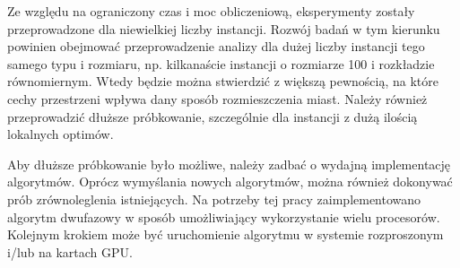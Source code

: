 Ze względu na ograniczony czas i moc obliczeniową, eksperymenty zostały przeprowadzone dla niewielkiej liczby instancji.
Rozwój badań w tym kierunku powinien obejmować przeprowadzenie analizy dla dużej liczby instancji tego samego typu i rozmiaru,
np. kilkanaście instancji o rozmiarze 100 i rozkładzie równomiernym.
Wtedy będzie można stwierdzić z większą pewnością, na które cechy przestrzeni wpływa dany sposób rozmieszczenia miast.
Należy również przeprowadzić dłuższe próbkowanie, szczególnie dla instancji z dużą ilością lokalnych optimów.

Aby dłuższe próbkowanie było możliwe, należy zadbać o wydajną implementację algorytmów.
Oprócz wymyślania nowych algorytmów, można również dokonywać prób zrównoleglenia istniejących.
Na potrzeby tej pracy zaimplementowano algorytm dwufazowy w sposób umożliwiający wykorzystanie wielu procesorów.
Kolejnym krokiem może być uruchomienie algorytmu w systemie rozproszonym i/lub na kartach GPU.